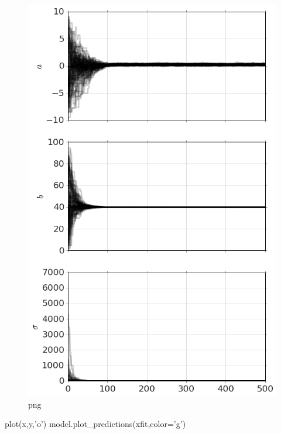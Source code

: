 \documentclass[]{article}
\newenvironment{Shaded}{}{}
\newcommand{\StringTok}[1]{\textcolor[rgb]{0.25,0.44,0.63}{{#1}}}
\newcommand{\NormalTok}[1]{{#1}}
\begin{document}
\begin{figure}[htbp]
\centering
\includegraphics{output_21_2.png}
\caption{png}
\end{figure}

\begin{Shaded}
\begin{Highlighting}[]
\NormalTok{plot(x,y,}\StringTok{'o'}\NormalTok{)}
\NormalTok{model.plot_predictions(xfit,color=}\StringTok{'g'}\NormalTok{)}
\end{Highlighting}
\end{Shaded}
\end{document}
